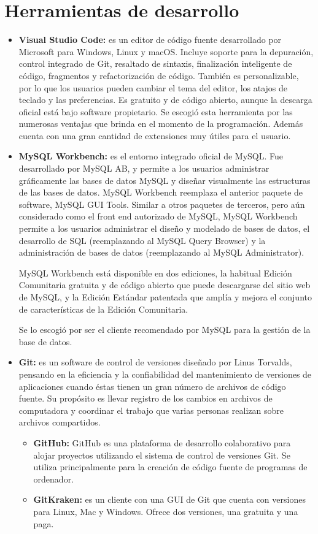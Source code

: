 \section{Herramientas de desarrollo}
	
		\begin{itemize}
			\item  \textbf{Visual Studio Code:} es un editor de código fuente desarrollado por Microsoft para Windows, Linux y macOS. Incluye soporte para la depuración, control integrado de Git, resaltado de sintaxis, finalización inteligente de código, fragmentos y refactorización de código. También es personalizable, por lo que los usuarios pueden cambiar el tema del editor, los atajos de teclado y las preferencias. Es gratuito y de código abierto, aunque la descarga oficial está bajo software propietario. Se escogió esta herramienta por las numerosas ventajas que brinda en el momento de la programación. Además cuenta con una gran cantidad de extensiones muy útiles para el usuario.

			\item \textbf{MySQL Workbench:} es el entorno integrado oficial de MySQL. Fue desarrollado por MySQL AB, y permite a los usuarios administrar gráficamente las bases de datos MySQL y diseñar visualmente las estructuras de las bases de datos. MySQL Workbench reemplaza el anterior paquete de software, MySQL GUI Tools. Similar a otros paquetes de terceros, pero aún considerado como el front end autorizado de MySQL, MySQL Workbench permite a los usuarios administrar el diseño y modelado de bases de datos, el desarrollo de SQL (reemplazando al MySQL Query Browser) y la administración de bases de datos (reemplazando al MySQL Administrator).

			MySQL Workbench está disponible en dos ediciones, la habitual Edición Comunitaria gratuita y de código abierto que puede descargarse del sitio web de MySQL, y la Edición Estándar patentada que amplía y mejora el conjunto de características de la Edición Comunitaria. 
			
			Se lo escogió por ser el cliente recomendado por MySQL para la gestión de la base de datos.
			
			\item \textbf{Git:} es un software de control de versiones diseñado por Linus Torvalds, pensando en la eficiencia y la confiabilidad del mantenimiento de versiones de aplicaciones cuando éstas tienen un gran número de archivos de código fuente. Su propósito es llevar registro de los cambios en archivos de computadora y coordinar el trabajo que varias personas realizan sobre archivos compartidos.
				\begin{itemize}
				\item \textbf{GitHub:} GitHub es una plataforma de desarrollo colaborativo para alojar proyectos utilizando el sistema de control de versiones Git. Se utiliza principalmente para la creación de código fuente de programas de ordenador.
				\item \textbf{GitKraken:} es un cliente con una GUI de Git que cuenta con versiones para Linux, Mac y Windows. Ofrece dos versiones, una gratuita y una paga.
				\end{itemize}
			

\end{itemize}
